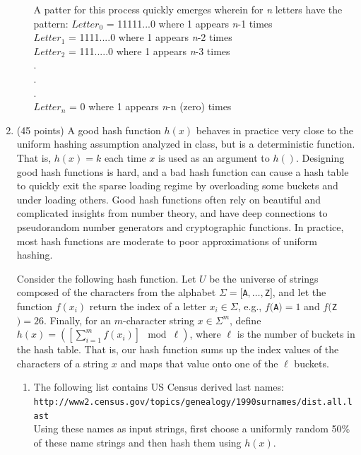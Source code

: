 \documentclass[12pt]{article}
\begin{document}
\begin{enumerate}
\begin{enumerate}
    A patter for this process quickly emerges wherein for \textit{n} letters have the pattern:
    $Letter_{0}$ = 11111...0 where 1 appears \textit{n}-1 times \\
    $Letter_{1}$ = 1111....0 where 1 appears \textit{n}-2 times \\
    $Letter_{2}$ = 111.....0 where 1 appears \textit{n}-3 times \\
     . \\
     . \\
     . \\
    $Letter_{n}$ = 0 where 1 appears \textit{n}-n (zero) times \\

\end{enumerate}

	\item (45 points) A good hash function $h(x)$ behaves in practice very close to the uniform hashing assumption analyzed in class, but is a deterministic function. That is, $h(x)=k$ each time $x$ is used as an argument to $h()$. Designing good hash functions is hard, and a bad hash function can cause a hash table to quickly exit the sparse loading regime by overloading some buckets and under loading others. Good hash functions often rely on beautiful and complicated insights from number theory, and have deep connections to pseudorandom number generators and cryptographic functions. In practice, most hash functions are moderate to poor approximations of uniform hashing.
	
	\smallskip Consider the following hash function. Let $U$ be the universe of strings composed of the characters from the alphabet $\Sigma=[${\tt A}$,\dots,${\tt Z}$]$, and let the function $f(x_{i})$ return the index of a letter $x_{i}\in \Sigma$, e.g., $f(${\tt A}$)=1$ and $f(${\tt Z}$)=26$. Finally, for an $m$-character string $x\in \Sigma^{m}$, define $h(x) = \left(\left[\sum_{i=1}^{m}f(x_{i})\right]\!\! \mod \ell\right)$, where $\ell$ is the number of buckets in the hash table. That is, our hash function sums up the index values of the characters of a string $x$ and maps that value onto one of the $\ell$ buckets.
	
	\begin{enumerate}
    	\item The following list contains US Census derived last names: \\
    	{\tt http://www2.census.gov/topics/genealogy/1990surnames/dist.all.last} \\
    	Using these names as input strings, first choose a uniformly random 50\% of these name strings and then hash them using $h(x)$.
    	

\end{enumerate}
\end{enumerate}
\end{document}
